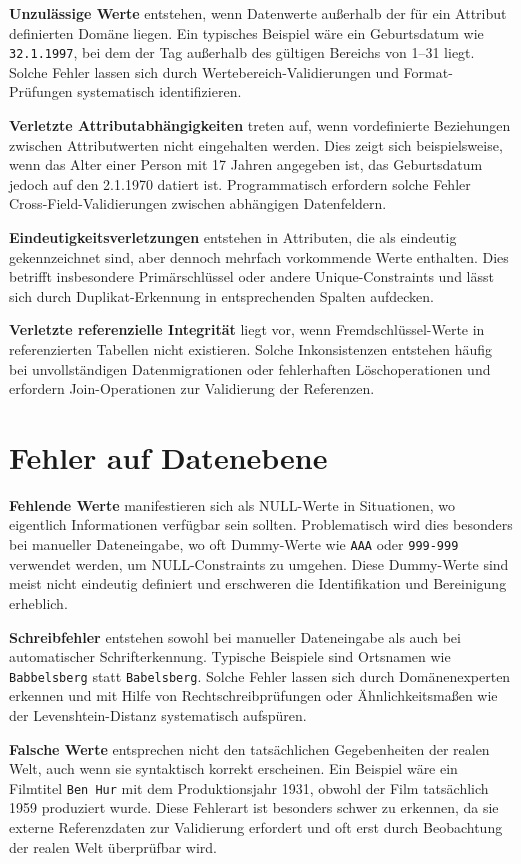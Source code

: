 \documentclass[
    a4paper,
    12pt,
    headinclude=true,
    BCOR=10mm,
]{scrreprt}
\begin{document}
\textbf{Unzulässige Werte} entstehen, wenn Datenwerte außerhalb der für ein Attribut definierten Domäne liegen. Ein typisches Beispiel wäre ein Geburtsdatum wie \texttt{32.1.1997}, bei dem der Tag außerhalb des gültigen Bereichs von 1--31 liegt. Solche Fehler lassen sich durch Wertebereich-Validierungen und Format-Prüfungen systematisch identifizieren.

\textbf{Verletzte Attributabhängigkeiten} treten auf, wenn vordefinierte Beziehungen zwischen Attributwerten nicht eingehalten werden. Dies zeigt sich beispielsweise, wenn das Alter einer Person mit 17 Jahren angegeben ist, das Geburtsdatum jedoch auf den 2.1.1970 datiert ist. Programmatisch erfordern solche Fehler Cross-Field-Validierungen zwischen abhängigen Datenfeldern.

\textbf{Eindeutigkeitsverletzungen} entstehen in Attributen, die als eindeutig gekennzeichnet sind, aber dennoch mehrfach vorkommende Werte enthalten. Dies betrifft insbesondere Primärschlüssel oder andere Unique-Constraints und lässt sich durch Duplikat-Erkennung in entsprechenden Spalten aufdecken.

\textbf{Verletzte referenzielle Integrität} liegt vor, wenn Fremdschlüssel-Werte in referenzierten Tabellen nicht existieren. Solche Inkonsistenzen entstehen häufig bei unvollständigen Datenmigrationen oder fehlerhaften Löschoperationen und erfordern Join-Operationen zur Validierung der Referenzen.

\section{Fehler auf Datenebene}

\textbf{Fehlende Werte} manifestieren sich als NULL-Werte in Situationen, wo eigentlich Informationen verfügbar sein sollten. Problematisch wird dies besonders bei manueller Dateneingabe, wo oft Dummy-Werte wie \texttt{AAA} oder \texttt{999-999} verwendet werden, um NULL-Constraints zu umgehen. Diese Dummy-Werte sind meist nicht eindeutig definiert und erschweren die Identifikation und Bereinigung erheblich.

\textbf{Schreibfehler} entstehen sowohl bei manueller Dateneingabe als auch bei automatischer Schrifterkennung. Typische Beispiele sind Ortsnamen wie \texttt{Babbelsberg} statt \texttt{Babelsberg}. Solche Fehler lassen sich durch Domänenexperten erkennen und mit Hilfe von Rechtschreibprüfungen oder Ähnlichkeitsmaßen wie der Levenshtein-Distanz systematisch aufspüren.

\textbf{Falsche Werte} entsprechen nicht den tatsächlichen Gegebenheiten der realen Welt, auch wenn sie syntaktisch korrekt erscheinen. Ein Beispiel wäre ein Filmtitel \texttt{Ben Hur} mit dem Produktionsjahr 1931, obwohl der Film tatsächlich 1959 produziert wurde. Diese Fehlerart ist besonders schwer zu erkennen, da sie externe Referenzdaten zur Validierung erfordert und oft erst durch Beobachtung der realen Welt überprüfbar wird.
\end{document}
